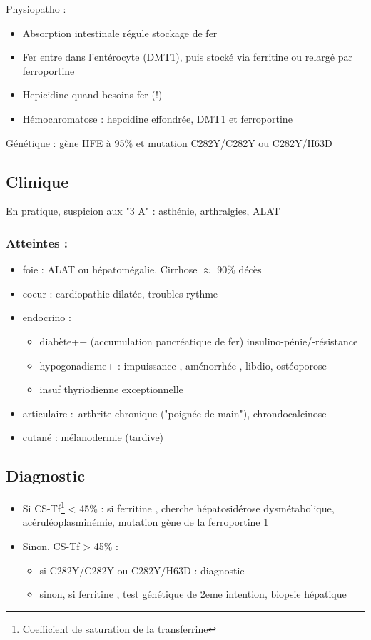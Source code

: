 \documentclass[11pt]{article}
\begin{document}
Physiopatho : 
\begin{itemize}
\item Absorption intestinale régule stockage de fer
\item Fer entre dans l'entérocyte (DMT1), puis stocké via ferritine ou relargé par ferroportine
\item Hepicidine \dec quand besoins fer \inc (!)
\item Hémochromatose : hepcidine effondrée, DMT1 et ferroportine \inc
\end{itemize}

Génétique : gène HFE à 95\% et mutation C282Y/C282Y ou C282Y/H63D

\subsection{Clinique}
\label{sec:orgc526ac9}
En pratique, suspicion aux "3 A" : asthénie, arthralgies, \inc ALAT

\subsubsection{Atteintes :}
\label{sec:orgd3a5234}
\begin{itemize}
\item foie : \inc ALAT ou hépatomégalie. Cirrhose \(\approx\) 90\% décès
\item coeur : cardiopathie dilatée, troubles rythme
\item endocrino :
\begin{itemize}
\item diabète++ (accumulation pancréatique de fer) insulino-pénie/-résistance
\item hypogonadisme+ : impuissance \male, aménorrhée \female, \dec libdio,
ostéoporose
\item insuf thyriodienne exceptionnelle
\end{itemize}
\item articulaire : arthrite chronique ("poignée de main"), chrondocalcinose
\item cutané : mélanodermie (tardive)
\end{itemize}


\subsection{Diagnostic}
\label{sec:orgb308479}
\begin{itemize}
\item Si CS-Tf\footnote{Coefficient de saturation de la transferrine} < 45\% : si ferritine \inc, cherche hépatosidérose dysmétabolique,
acéruléoplasminémie, mutation gène de la ferroportine 1
\item Sinon, CS-Tf > 45\% : 
\begin{itemize}
\item si C282Y/C282Y ou C282Y/H63D : diagnostic
\item sinon, si ferritine \inc, test génétique de 2eme intention, biopsie
hépatique
\end{itemize}
\end{itemize}
\end{document}
